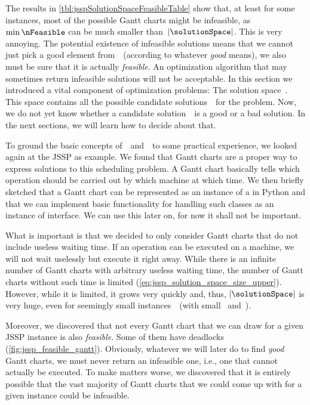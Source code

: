 The results in \autoref{tbl:jsspSolutionSpaceFeasibleTable} show that, at least for some instances, most of the possible Gantt charts might be infeasible, as~$\min\nFeasible$ can be much smaller than~$\left|\solutionSpace\right|$.
%
%
%
This is very annoying.
The potential existence of infeasible solutions means that we cannot just pick a good element from~\solutionSpace\ (according to whatever \emph{good} means), we also must be sure that it is actually \emph{feasible}.
An optimization algorithm that may sometimes return infeasible solutions will not be acceptable.%
%
\endhsection%
%
%
%
In this section we introduced a vital component of optimization problems: The solution space~\solutionSpace.
This space contains all the possible candidate solutions~\solspel\ for the problem.
Now, we do not yet know whether a candidate solution~\solspel\ is a good or a bad solution.
In the next sections, we will learn how to decide about that.

To ground the basic concepts of~\solutionSpace\ and~\solspel\ to some practical experience, we looked again at the \gls{JSSP} as example.
We found that Gantt charts are a proper way to express solutions to this scheduling problem.
A Gantt chart basically tells which operation should be carried out by which machine at which time.
We then briefly sketched that a Gantt chart can be represented as an instance of a  in Python and that we can implement basic functionality for handling such classes as an instance of  interface.
We can use this later on, for now it shall not be important.

What is important is that we decided to only consider Gantt charts that do not include useless waiting time.
If an operation can be executed on a machine, we will not wait uselessly but execute it right away.
While there is an infinite number of Gantt charts with arbitrary useless waiting time, the number of Gantt charts without such time is limited (\autoref{eq:jssp_solution_space_size_upper}).
However, while it is limited, it grows very quickly and, thus, $|\solutionSpace|$ is very huge, even for seemingly small instances~\instance\ (with small \jsspMachines\ and~\jsspJobs).

Moreover, we discovered that not every Gantt chart that we can draw for a given \gls{JSSP} instance is also \emph{feasible}.
Some of them have deadlocks (\ref{fig:jssp_feasible_gantt}).
Obviously, whatever we will later do to find \emph{good} Gantt charts, we must never return an infeasible one, i.e., one that cannot actually be executed.
To make matters worse, we discovered that it is entirely possible that the vast majority of Gantt charts that we could come up with for a given instance could be infeasible.

